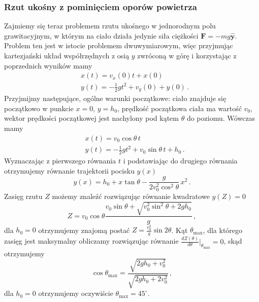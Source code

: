 \documentclass[../main.tex]{subfiles}
\begin{document}
\subsubsection{Rzut ukośny z pominięciem oporów powietrza}
Zajmiemy się teraz problemem rzutu ukośnego w jednorodnym polu grawitacyjnym, w którym na ciało
działa jedynie siła ciężkości \(\mathbf{F}=-mg\mathbf{\hat y}\). Problem ten jest w istocie
problemem dwuwymiarowym, więc przyjmując kartezjański układ współrzędnych z osią \(y\) zwróconą w
górę i korzystając z poprzednich wyników mamy
\begin{equation*}
\begin{split}
    &x(t)=v_x(0)t+x(0)\\
    &y(t)=-\frac{1}{2}gt^2+v_y(0)+y(0)\,.
\end{split}
\end{equation*}
Przyjmijmy następujące, ogólne warunki początkowe: ciało znajduje się początkowo w punkcie \(x=0\),
\(y=h_0\), prędkość początkowa ciała ma wartość \(v_0\), wektor prędkości początkowej jest nachylony
pod kątem \(\theta\) do poziomu. Wówczas mamy
\begin{equation*}
    \begin{split}
        &x(t)=v_0\cos\theta\,t\\
        &y(t)=-\frac{1}{2}gt^2+v_0\sin\theta\,t+h_0\,.
    \end{split}
\end{equation*}
Wyznaczając z pierwszego równania \(t\) i podstawiając do drugiego równania otrzymujemy równanie
trajektorii pocisku \(y(x)\)
\begin{equation*}
    y(x)=h_0+x\tan\theta-\frac{g}{2v_0^2\cos^2\theta}\,x^2\,.
\end{equation*}
Zasięg rzutu \(Z\) możemy znaleźć  rozwiązując równanie kwadratowe \(y(Z)=0\)
\begin{equation*}
    Z=v_0\cos\theta\frac{v_0\sin\theta+\sqrt{v_0^2\sin^2\theta+2gh_0}}{g}\,,
\end{equation*}
dla \(h_0=0\) otrzymujemy znajomą postać \(Z=\frac{v_0^2}{g}\sin2\theta\). Kąt
\(\theta_\text{max}\), dla którego zasięg jest maksymalny obliczamy rozwiązując równanie
\(\frac{dZ(\theta)}{d\theta}|_{\theta_\text{max}}=0\), skąd otrzymujemy
\begin{equation*}
    \cos\theta_\text{max}=\frac{\sqrt{2gh_0+v_0^2}}{\sqrt{2gh_0+2v_0^2}}\,,
\end{equation*}
dla \(h_0=0\) otrzymujemy oczywiście \(\theta_\text{max}=45^\circ\).
\end{document}
